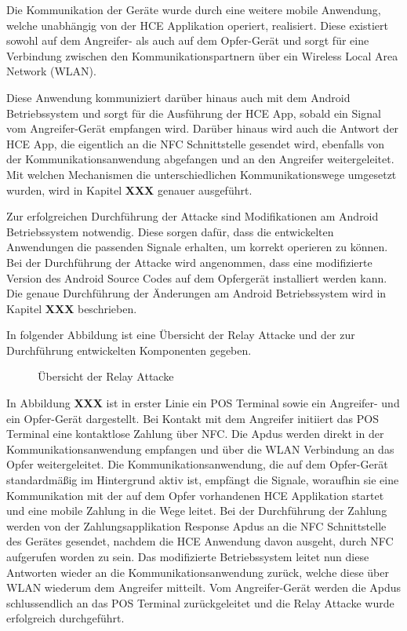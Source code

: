Die Kommunikation der Geräte wurde durch eine weitere mobile Anwendung, welche unabhängig von der HCE Applikation operiert, realisiert. Diese existiert sowohl auf dem Angreifer- als auch auf dem Opfer-Gerät und sorgt für eine Verbindung zwischen den Kommunikationspartnern über ein Wireless Local Area Network (WLAN). 

Diese Anwendung kommuniziert darüber hinaus auch mit dem Android Betriebssystem und sorgt für die Ausführung der HCE App, sobald ein Signal vom Angreifer-Gerät empfangen wird. Darüber hinaus wird auch die Antwort der HCE App, die eigentlich an die NFC Schnittstelle gesendet wird, ebenfalls von der Kommunikationsanwendung abgefangen und an den Angreifer weitergeleitet. Mit welchen Mechanismen die unterschiedlichen Kommunikationswege umgesetzt wurden, wird in Kapitel \textbf{XXX} genauer ausgeführt. 

Zur erfolgreichen Durchführung der Attacke sind Modifikationen am Android Betriebssystem notwendig. Diese sorgen dafür, dass die entwickelten Anwendungen die passenden Signale erhalten, um korrekt operieren zu können. Bei der Durchführung der Attacke wird angenommen, dass eine modifizierte Version des Android Source Codes auf dem Opfergerät installiert werden kann.
Die genaue Durchführung der Änderungen am Android Betriebssystem wird in Kapitel \textbf{XXX} beschrieben. 

In folgender Abbildung ist eine Übersicht der Relay Attacke und der zur Durchführung entwickelten Komponenten gegeben. 

\begin{figure}
	\centering
	\caption{Übersicht der Relay Attacke}
\end{figure}

In Abbildung \textbf{XXX} ist in erster Linie ein POS Terminal sowie ein Angreifer- und ein Opfer-Gerät dargestellt. Bei Kontakt mit dem Angreifer initiiert das POS Terminal eine kontaktlose Zahlung über NFC. Die Apdus werden direkt in der Kommunikationsanwendung empfangen und über die WLAN Verbindung an das Opfer weitergeleitet. Die Kommunikationsanwendung, die auf dem Opfer-Gerät standardmäßig im Hintergrund aktiv ist, empfängt die Signale, woraufhin sie eine Kommunikation mit der auf dem Opfer vorhandenen HCE Applikation startet und eine mobile Zahlung in die Wege leitet. 
Bei der Durchführung der Zahlung werden von der Zahlungsapplikation Response Apdus an die NFC Schnittstelle des Gerätes gesendet, nachdem die HCE Anwendung davon ausgeht, durch NFC aufgerufen worden zu sein. 
Das modifizierte Betriebssystem leitet nun diese Antworten wieder an die Kommunikationsanwendung zurück, welche diese über WLAN wiederum dem Angreifer mitteilt. Vom Angreifer-Gerät werden die Apdus schlussendlich an das POS Terminal zurückgeleitet und die Relay Attacke wurde erfolgreich durchgeführt. 

